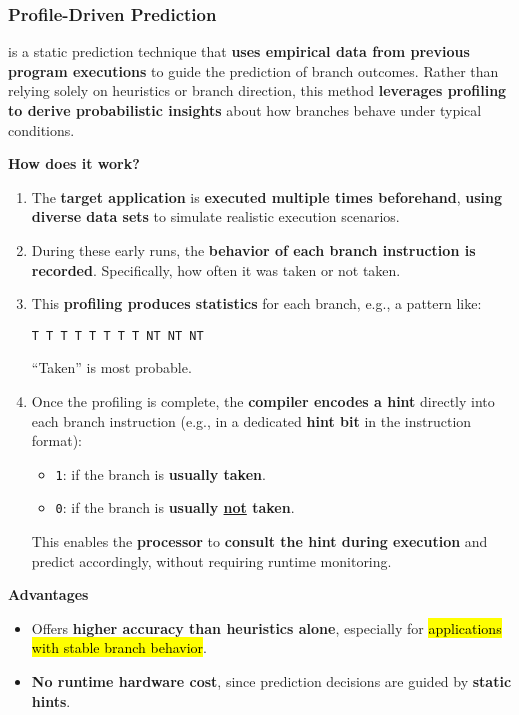 \subsubsection{Profile-Driven Prediction}

 is a static prediction technique that \textbf{uses empirical data from previous program executions} to guide the prediction of branch outcomes. Rather than relying solely on heuristics or branch direction, this method \textbf{leverages profiling to derive probabilistic insights} about how branches behave under typical conditions.

\highspace
\begin{flushleft}
    \textcolor{Green3}{ \textbf{How does it work?}}
\end{flushleft}
\begin{enumerate}
    \item The \textbf{target application} is \textbf{executed multiple times beforehand}, \textbf{using diverse data sets} to simulate realistic execution scenarios.

    \item During these early runs, the \textbf{behavior of each branch instruction is recorded}. Specifically, how often it was taken or not taken.

    \item This \textbf{profiling produces statistics} for each branch, e.g., a pattern like:
    \begin{center}
      \texttt{T  T  T  T  T  T  T  T  NT  NT  NT}
    \end{center}
    ``Taken'' is most probable.

    \item Once the profiling is complete, the \textbf{compiler encodes a hint} directly into each branch instruction (e.g., in a dedicated \textbf{hint bit} in the instruction format):
    \begin{itemize}
      \item \texttt{1}: if the branch is \textbf{usually taken}.
      \item \texttt{0}: if the branch is \textbf{usually \underline{not} taken}.
    \end{itemize}
    This enables the \textbf{processor} to \textbf{consult the hint during execution} and predict accordingly, without requiring runtime monitoring.
\end{enumerate}

\highspace
\begin{flushleft}
  \textcolor{Green3}{ \textbf{Advantages}}
\end{flushleft}
\begin{itemize}[label=\textcolor{Green3}{}]
  \item Offers \textbf{higher accuracy than heuristics alone}, especially for \hl{applications with stable branch behavior}.
  \item \textbf{No runtime hardware cost}, since prediction decisions are guided by \textbf{static hints}.
\end{itemize}

